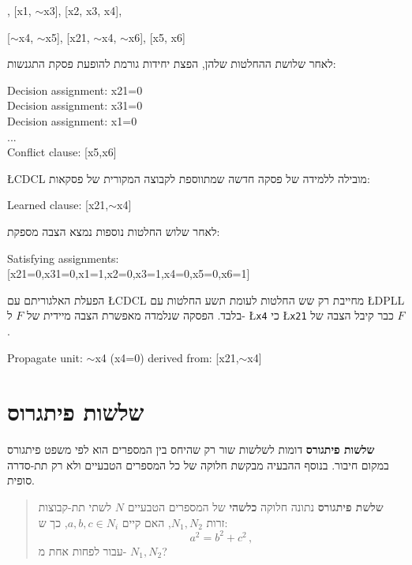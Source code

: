 \documentclass[12pt,a4paper]{article}
\begin{document}
\begin{ttfamily}
[x1, x31, $\sim$x2], [x1, $\sim$x3], [x2, x3, x4],

[$\sim$x4, $\sim$x5], [x21, $\sim$x4, $\sim$x6], [x5, x6]
\end{ttfamily}
לאחר שלושת ההחלטות שלהן, הפצת יחידות גורמת להופעת פסקת התגנשות:
\begin{ttfamily}
Decision assignment: x21=0\\
Decision assignment: x31=0\\
Decision assignment: x1=0\\
  ...\\
Conflict clause: [x5,x6]
\end{ttfamily}

\L{CDCL}
מובילה ללמידה של פסקה חדשה שמתווספת לקבוצה המקורית של פסקאות:

\begin{ttfamily}
Learned clause: [x21,$\sim$x4]
\end{ttfamily}

לאחר שלוש החלטות נוספות נמצא הצבה מספקת:

\begin{ttfamily}
Satisfying assignments:\\
{[}x21=0,x31=0,x1=1,x2=0,x3=1,x4=0,x5=0,x6=1]
\end{ttfamily}

הפעלת האלגוריתם עם
\L{CDCL}
מחייבת רק שש החלטות לעומת תשע החלטות עם
\L{DPLL}
בלבד. הפסקה שנלמדה מאפשרת הצבה מיידית של
$F$
ל-%
\L{\texttt{x4}}
כי 
\L{\texttt{x21}}
כבר קיבל הצבה של
$F$.

\begin{ttfamily}
Propagate unit: $\sim$x4 (x4=0) derived from: [x21,$\sim$x4]
\end{ttfamily}

\section{שלשות פיתגרוס}

\textbf{שלשות פיתגורס}
דומות לשלשות שור רק שהיחס בין המספרים הוא לפי משפט פיתגורס במקום חיבור. בנוסף ההבעיה מבקשת חלוקה של כל המספרים הטבעיים ולא רק תת-סדרה סופית.
\begin{quote}
\textbf{שלשת פיתגורס} 
נתונה חלוקה 
\textbf{כלשהי}
של המספרים הטבעיים
$N$
לשתי תת-קבוצות זרות
$N_1,N_2$, 
האם קיים
$a,b,c\in N_i$,
כך ש:
\[
a^2=b^2+c^2\,,
\]
עבור לפחות אחת מ-%
$N_1,N_2$?
\end{quote}
\end{document}
